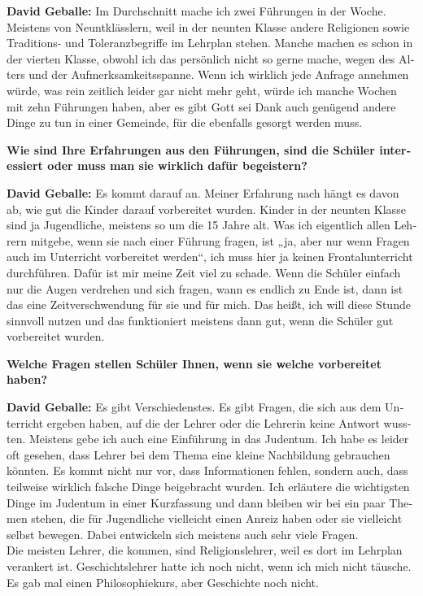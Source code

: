 \begin{otherlanguage}{ngerman}
\textbf{David Geballe:} Im Durchschnitt mache ich zwei Führungen in der Woche. Meistens von Neuntklässlern, weil in der neunten Klasse andere Religionen sowie Traditions- und Toleranzbegriffe im Lehrplan stehen. Manche machen es schon in der vierten Klasse, obwohl ich das persönlich nicht so gerne mache, wegen des Alters und der Aufmerksamkeitsspanne. Wenn ich wirklich jede Anfrage annehmen würde, was rein zeitlich leider gar nicht mehr geht, würde ich manche Wochen mit zehn Führungen haben, aber es gibt Gott sei Dank auch genügend andere Dinge zu tun in einer Gemeinde, für die ebenfalls gesorgt werden muss. 

\textbf{Wie sind Ihre Erfahrungen aus den Führungen, sind die Schüler interessiert oder muss man sie wirklich dafür begeistern?} 

\textbf{David Geballe:} Es kommt darauf an. Meiner Erfahrung nach hängt es davon ab, wie gut die Kinder darauf vorbereitet wurden. Kinder in der neunten Klasse sind ja Jugendliche, meistens so um die 15 Jahre alt. Was ich eigentlich allen Lehrern mitgebe, wenn sie nach einer Führung fragen, ist „ja, aber nur wenn Fragen auch im Unterricht vorbereitet werden“, ich muss hier ja keinen Frontalunterricht durchführen. Dafür ist mir meine Zeit viel zu schade. Wenn die Schüler einfach nur die Augen verdrehen und sich fragen, wann es endlich zu Ende ist, dann ist das eine Zeitverschwendung für sie und für mich. Das heißt, ich will diese Stunde sinnvoll nutzen und das funktioniert meistens dann gut, wenn die Schüler gut vorbereitet wurden. 

\textbf{Welche Fragen stellen Schüler Ihnen, wenn sie welche vorbereitet haben?} 

\textbf{David Geballe:} Es gibt Verschiedenstes. Es gibt Fragen, die sich aus dem Unterricht ergeben haben, auf die der Lehrer oder die Lehrerin keine Antwort wussten. Meistens gebe ich auch eine Einführung in das Judentum. Ich habe es leider oft gesehen, dass Lehrer bei dem Thema eine kleine Nachbildung gebrauchen könnten. Es kommt nicht nur vor, dass Informationen fehlen, sondern auch, dass teilweise wirklich falsche Dinge beigebracht wurden. Ich erläutere die wichtigsten Dinge im Judentum in einer Kurzfassung und dann bleiben wir bei ein paar Themen stehen, die für Jugendliche vielleicht einen Anreiz haben oder sie vielleicht selbst bewegen. Dabei entwickeln sich meistens auch sehr viele Fragen.\\
Die meisten Lehrer, die kommen, sind Religionslehrer, weil es dort im Lehrplan verankert ist. Geschichtslehrer hatte ich noch nicht, wenn ich mich nicht täusche. Es gab mal einen Philosophiekurs, aber Geschichte noch nicht. 


\end{otherlanguage}
